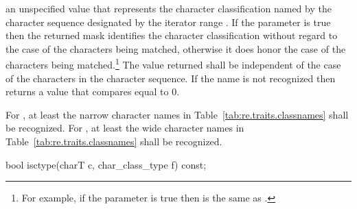 \begin{itemdescr}
\pnum\returns  an unspecified value that represents
the character classification named by the character sequence
designated by the iterator range .
If the parameter  is true then the returned mask identifies the
character classification without regard to the case of the characters being
matched, otherwise it does honor the case of the characters being
matched.\footnote{For example, if the parameter  is true then
\tcode{[[:lower:]]} is the same as \tcode{[[:alpha:]]}.}
The value
returned shall be independent of the case of the characters in
the character sequence. If the name
is not recognized then returns a value that compares equal to 0.

\pnum
\notes  For , at least the narrow character names
in Table~\ref{tab:re.traits.classnames} shall be recognized.
For , at least the wide character names
in Table~\ref{tab:re.traits.classnames} shall be recognized.
\end{itemdescr}

%
%
\begin{itemdecl}
bool isctype(charT c, char_class_type f) const; 
\end{itemdecl}

